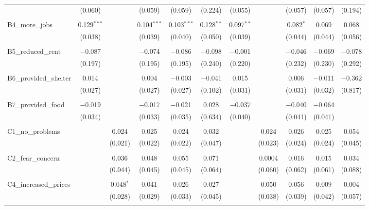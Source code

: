 \begin{table}[H]
\begin{tabular}{@{\extracolsep{4pt}}lcccccccccc}
  & (0.060) &  & (0.059) & (0.059) & (0.224) & (0.055) &  & (0.057) & (0.057) & (0.194) \\ 
  & & & & & & & & & & \\ 
 B4\_more\_jobs & 0.129$^{***}$ &  & 0.104$^{***}$ & 0.103$^{***}$ & 0.128$^{**}$ & 0.097$^{**}$ &  & 0.082$^{*}$ & 0.069 & 0.068 \\ 
  & (0.038) &  & (0.039) & (0.040) & (0.050) & (0.039) &  & (0.044) & (0.044) & (0.056) \\ 
  & & & & & & & & & & \\ 
 B5\_reduced\_rent & $-$0.087 &  & $-$0.074 & $-$0.086 & $-$0.098 & $-$0.001 &  & $-$0.046 & $-$0.069 & $-$0.078 \\ 
  & (0.197) &  & (0.195) & (0.195) & (0.240) & (0.220) &  & (0.232) & (0.230) & (0.292) \\ 
  & & & & & & & & & & \\ 
 B6\_provided\_shelter & 0.014 &  & 0.004 & $-$0.003 & $-$0.041 & 0.015 &  & 0.006 & $-$0.011 & $-$0.362 \\ 
  & (0.027) &  & (0.027) & (0.027) & (0.102) & (0.031) &  & (0.031) & (0.032) & (0.817) \\ 
  & & & & & & & & & & \\ 
 B7\_provided\_food & $-$0.019 &  & $-$0.017 & $-$0.021 & 0.028 & $-$0.037 &  & $-$0.040 & $-$0.064 &  \\ 
  & (0.034) &  & (0.033) & (0.035) & (0.634) & (0.040) &  & (0.041) & (0.041) &  \\ 
  & & & & & & & & & & \\ 
 C1\_no\_problems &  & 0.024 & 0.025 & 0.024 & 0.032 &  & 0.024 & 0.026 & 0.025 & 0.054 \\ 
  &  & (0.021) & (0.022) & (0.022) & (0.047) &  & (0.023) & (0.024) & (0.024) & (0.045) \\ 
  & & & & & & & & & & \\ 
 C2\_fear\_concern &  & 0.036 & 0.048 & 0.055 & 0.071 &  & 0.0004 & 0.016 & 0.015 & 0.034 \\ 
  &  & (0.044) & (0.045) & (0.045) & (0.064) &  & (0.060) & (0.062) & (0.061) & (0.088) \\ 
  & & & & & & & & & & \\ 
 C4\_increased\_prices &  & 0.048$^{*}$ & 0.041 & 0.026 & 0.027 &  & 0.050 & 0.056 & 0.009 & 0.004 \\ 
  &  & (0.028) & (0.029) & (0.033) & (0.045) &  & (0.038) & (0.039) & (0.042) & (0.057) \\ 
  & & & & & & & & & & \\ 

\end{tabular}
\end{table}
